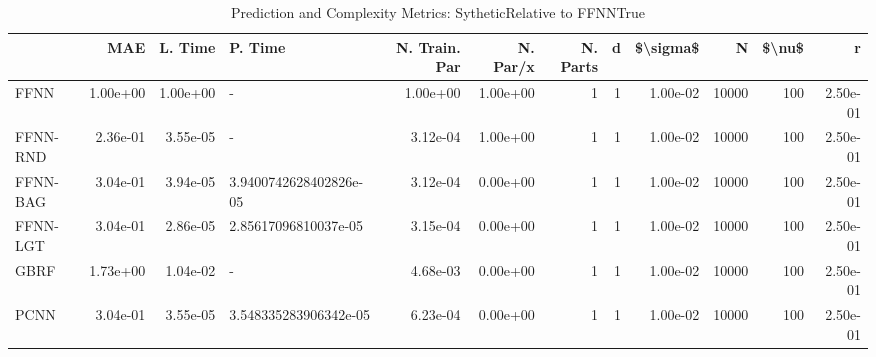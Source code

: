 \begin{table}
\centering
\caption{Prediction and Complexity Metrics: SytheticRelative to FFNNTrue}
\label{tab__Sythetic__Fix_Neurons_QTrue}
\begin{tabular}{lrrlrrrrrrrr}
\toprule
{} &      MAE &  L. Time &                 P. Time &  N. Train. Par &  N. Par/x &  N. Parts &  d &  \$\textbackslash sigma\$ &      N &  \$\textbackslash nu\$ &        r \\
\midrule
FFNN     & 1.00e+00 & 1.00e+00 &                       - &       1.00e+00 &  1.00e+00 &         1 &  1 &  1.00e-02 &  10000 &    100 & 2.50e-01 \\
FFNN-RND & 2.36e-01 & 3.55e-05 &                       - &       3.12e-04 &  1.00e+00 &         1 &  1 &  1.00e-02 &  10000 &    100 & 2.50e-01 \\
FFNN-BAG & 3.04e-01 & 3.94e-05 &  3.9400742628402826e-05 &       3.12e-04 &  0.00e+00 &         1 &  1 &  1.00e-02 &  10000 &    100 & 2.50e-01 \\
FFNN-LGT & 3.04e-01 & 2.86e-05 &    2.85617096810037e-05 &       3.15e-04 &  0.00e+00 &         1 &  1 &  1.00e-02 &  10000 &    100 & 2.50e-01 \\
GBRF     & 1.73e+00 & 1.04e-02 &                       - &       4.68e-03 &  0.00e+00 &         1 &  1 &  1.00e-02 &  10000 &    100 & 2.50e-01 \\
PCNN     & 3.04e-01 & 3.55e-05 &   3.548335283906342e-05 &       6.23e-04 &  0.00e+00 &         1 &  1 &  1.00e-02 &  10000 &    100 & 2.50e-01 \\
\bottomrule
\end{tabular}
\end{table}
